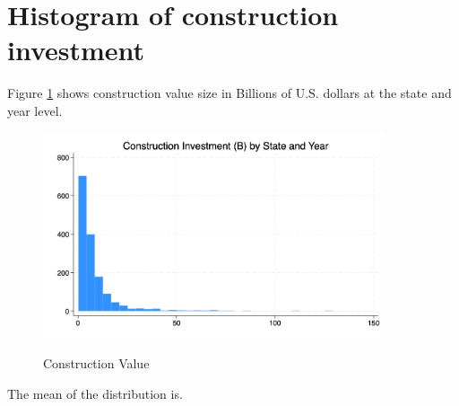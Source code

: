 \documentclass[12pt]{article}
\begin{document}
\section{Histogram of construction investment}
Figure \ref{fig:hist1} shows construction value size in Billions of U.S. dollars at the state and year level.
\vspace*{\baselineskip}

\begin{figure}[hp]
    \centering
    \caption{Construction Value} 
    \includegraphics[width=0.9\textwidth]{histinv.jpg}
    \label{fig:hist1}
\end{figure}
    \begin{center} \vspace*{-\baselineskip}
        \footnotesize {}
    \end{center}


The mean of the distribution is\MeanValue.
\end{document}
